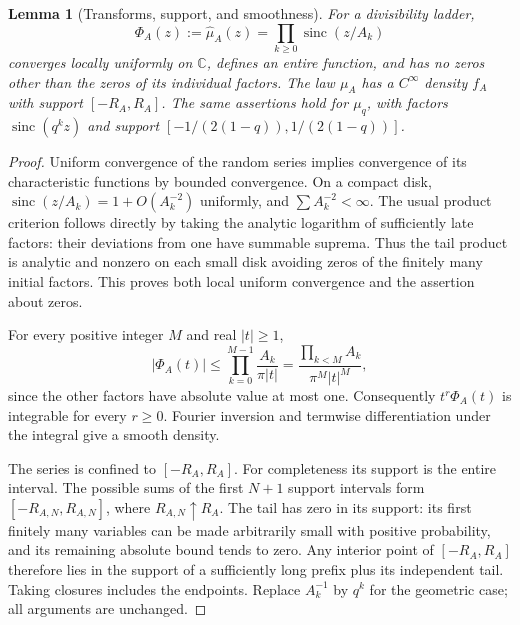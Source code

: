 \documentclass[11pt,a4paper]{article}
\newtheorem{lemma}[theorem]{Lemma}
\theoremstyle{definition}
\theoremstyle{remark}
\newcommand{\C}{\mathbb C}
\newcommand{\sinc}{\operatorname{sinc}}
\begin{document}
\begin{lemma}[Transforms, support, and smoothness]\label{lem:product}
For a divisibility ladder,
\begin{equation}\label{eq:ladder-product}
 \Phi_A(z):=\widehat\mu_A(z)=\prod_{k\ge0}\sinc(z/A_k)
\end{equation}
converges locally uniformly on $\C$, defines an entire function, and has no
zeros other than the zeros of its individual factors. The law $\mu_A$ has
a $C^\infty$ density $f_A$ with support $[-R_A,R_A]$.
The same assertions hold for $\mu_q$, with factors $\sinc(q^kz)$ and
support $[-1/(2(1-q)),1/(2(1-q))]$.
\end{lemma}
\begin{proof}
Uniform convergence of the random series implies convergence of its
characteristic functions by bounded convergence. On a compact disk,
$\sinc(z/A_k)=1+O(A_k^{-2})$ uniformly, and $\sum A_k^{-2}<\infty$.
The usual product criterion follows directly by taking the analytic
logarithm of sufficiently late factors: their deviations from one have
summable suprema. Thus the tail product is analytic and nonzero on each
small disk avoiding zeros of the finitely many initial factors. This proves
both local uniform convergence and the assertion about zeros.

For every positive integer $M$ and real $|t|\ge1$,
\begin{equation}\label{eq:rapid-decay}
 |\Phi_A(t)|\le \prod_{k=0}^{M-1}\frac{A_k}{\pi|t|}
 =\frac{\prod_{k<M}A_k}{\pi^M|t|^M},
\end{equation}
since the other factors have absolute value at most one. Consequently
$t^r\Phi_A(t)$ is integrable for every $r\ge0$. Fourier inversion and
termwise differentiation under the integral give a smooth density.

The series is confined to $[-R_A,R_A]$. For completeness its support is
the entire interval. The possible sums of the first $N+1$ support intervals
form $[-R_{A,N},R_{A,N}]$, where $R_{A,N}\uparrow R_A$.
The tail has zero in its support: its first finitely many variables can be
made arbitrarily small with positive probability, and its remaining
absolute bound tends to zero. Any interior point of $[-R_A,R_A]$ therefore
lies in the support of a sufficiently long prefix plus its independent
tail. Taking closures includes the endpoints. Replace $A_k^{-1}$ by $q^k$
for the geometric case; all arguments are unchanged.
\end{proof}
\end{document}
